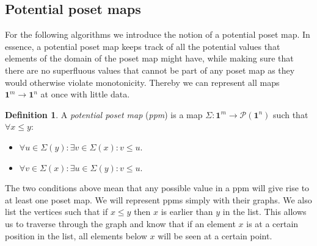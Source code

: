 \documentclass[11pt]{article}
\theoremstyle{definition}
\newtheorem{definition}{Definition}
\newcommand{\mname}[1]{\textit{{#1}}}
\newcommand{\pint}[1]{\mathbf{1}^{#1}}
\newcommand{\pintrestr}[3]{\mathbf{1}^{#1}_{{#2}={#3}}}
\newcommand{\restrict}[2]{{#1}|_{#2}}
\newcommand{\ctxtdim}[1]{|{#1}|}
\newcommand{\dmap}[2]{d^{({#1} , {#2})}}
\newcommand{\pow}[1]{\mathcal{P}({#1})}
\begin{document}





\subsection{Potential poset maps}
\label{ssec:ppm}

For the following algorithms we introduce the notion of a potential poset map. In
essence, a potential poset map keeps track of all the potential values that elements of
the domain of the poset map might have, while making sure that there are no
superfluous values that cannot be part of any poset map as they would otherwise
violate monotonicity. Thereby we can represent all maps $\pint{m} \to \pint{n}$
at once with little data.

\begin{definition}

  A \mname{potential poset map} (\mname{ppm}) is a map $\Sigma : \pint{m} \to \pow{\pint{n}}$
  such that $\forall x \leq y$:
  \begin{itemize}
  \item $\forall u \in \Sigma(y) : \exists v \in \Sigma(x) : v \leq u$.
  \item $\forall v \in \Sigma(x) : \exists u \in \Sigma(y) : v \leq u$.
  \end{itemize}

\end{definition}

The two conditions above mean that any possible value in a ppm will give
rise to at least one poset map.
We will represent ppms simply with their graphs. We also
list the vertices such that if $x \leq y$ then $x$ is earlier than $y$ in the
list. This allows us to traverse through the graph and know that if an element
$x$ is at a certain position in the list, all elements below $x$ will be seen at
a certain point.
\end{document}
